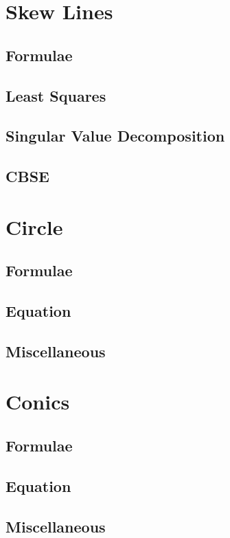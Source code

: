 \documentclass[journal]{IEEEtran}
\begin{document}
\section{Skew Lines}
\subsection{Formulae}

\subsection{Least Squares}

\subsection{Singular Value Decomposition}

\subsection{CBSE}

\newpage
\section{Circle}
\subsection{Formulae}

\subsection{Equation}

\subsection{Miscellaneous}

\newpage
\section{Conics}
\subsection{Formulae}

\subsection{Equation}

\subsection{Miscellaneous}

\end{document}
